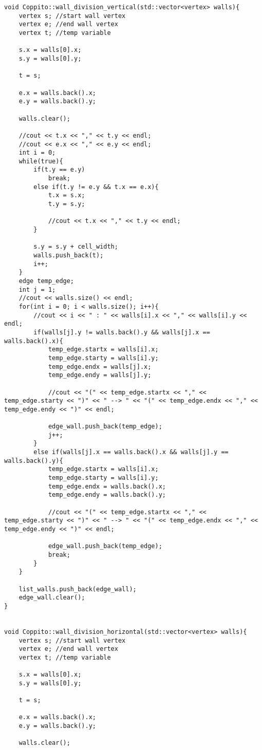 \begin{lstlisting}
void Coppito::wall_division_vertical(std::vector<vertex> walls){
	vertex s; //start wall vertex
	vertex e; //end wall vertex
	vertex t; //temp variable

	s.x = walls[0].x;
	s.y = walls[0].y;

	t = s;

	e.x = walls.back().x;
	e.y = walls.back().y;

	walls.clear();

	//cout << t.x << "," << t.y << endl;
	//cout << e.x << "," << e.y << endl;
	int i = 0;
	while(true){
		if(t.y == e.y)
			break;
		else if(t.y != e.y && t.x == e.x){
			t.x = s.x;
			t.y = s.y;

			//cout << t.x << "," << t.y << endl;
		}

		s.y = s.y + cell_width;
		walls.push_back(t);
		i++;
	}
	edge temp_edge;
	int j = 1;
	//cout << walls.size() << endl;
	for(int i = 0; i < walls.size(); i++){
		//cout << i << " : " << walls[i].x << "," << walls[i].y << endl;
		if(walls[j].y != walls.back().y && walls[j].x == walls.back().x){
			temp_edge.startx = walls[i].x;
			temp_edge.starty = walls[i].y;
			temp_edge.endx = walls[j].x;
			temp_edge.endy = walls[j].y;

			//cout << "(" << temp_edge.startx << "," << temp_edge.starty << ")" << " --> " << "(" << temp_edge.endx << "," << temp_edge.endy << ")" << endl;
			
			edge_wall.push_back(temp_edge);
			j++;
		}
		else if(walls[j].x == walls.back().x && walls[j].y == walls.back().y){
			temp_edge.startx = walls[i].x;
			temp_edge.starty = walls[i].y;
			temp_edge.endx = walls.back().x;
			temp_edge.endy = walls.back().y;

			//cout << "(" << temp_edge.startx << "," << temp_edge.starty << ")" << " --> " << "(" << temp_edge.endx << "," << temp_edge.endy << ")" << endl;

			edge_wall.push_back(temp_edge);
			break;
		}
	}

	list_walls.push_back(edge_wall);
	edge_wall.clear();
}


void Coppito::wall_division_horizontal(std::vector<vertex> walls){
	vertex s; //start wall vertex
	vertex e; //end wall vertex
	vertex t; //temp variable

	s.x = walls[0].x;
	s.y = walls[0].y;

	t = s;

	e.x = walls.back().x;
	e.y = walls.back().y;

	walls.clear();


\end{lstlisting}
